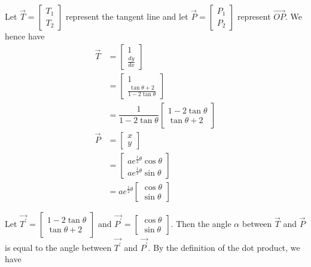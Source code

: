 \documentclass{jhwhw}
\begin{document}
        Let $\overrightarrow{T} = \begin{bmatrix}T_1\\T_2\end{bmatrix}$ represent the tangent line and let $\overrightarrow{P} = \begin{bmatrix}P_1\\P_2\end{bmatrix}$ represent $\overrightarrow{OP}$. We hence have
        \begin{align*}
            \overrightarrow{T} &= \begin{bmatrix}1\\\frac{dy}{dx}\end{bmatrix}\\
            &= \begin{bmatrix}1\\\frac{\tan\theta+2}{1-2\tan\theta}\end{bmatrix}\\
            &= \dfrac1{1-2\tan\theta}\begin{bmatrix}1-2\tan\theta\\\tan\theta+2\end{bmatrix}\\
            \overrightarrow{P} &= \begin{bmatrix}x\\y\end{bmatrix}\\
            &= \begin{bmatrix}ae^{\frac12 \theta}\cos\theta\\ae^{\frac12\theta}\sin\theta\end{bmatrix}\\
            &= ae^{\frac12 \theta}\begin{bmatrix}\cos\theta\\\sin\theta\end{bmatrix}
        \end{align*}

        Let $\overrightarrow{T^\prime} = \begin{bmatrix}1-2\tan\theta\\\tan\theta+2\end{bmatrix}$ and $\overrightarrow{P^\prime} = \begin{bmatrix}\cos\theta\\\sin\theta\end{bmatrix}$. Then the angle $\alpha$ between $\overrightarrow{T}$ and $\overrightarrow{P}$ is equal to the angle between  $\overrightarrow{T^\prime}$ and $\overrightarrow{P^\prime}$. By the definition of the dot product, we have
\end{document}

